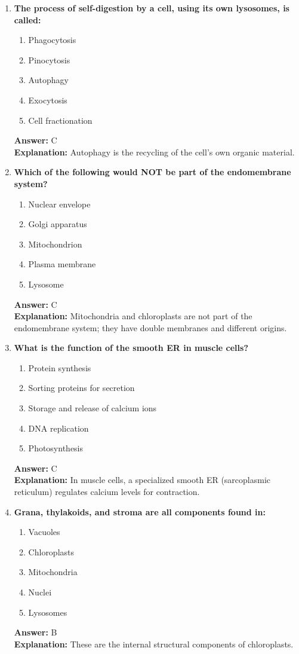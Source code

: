 \documentclass[11pt, a4paper]{article}
\begin{document}
\begin{enumerate}[leftmargin=*, label=\arabic*.]
\item \textbf{The process of self-digestion by a cell, using its own lysosomes, is called:}
\begin{enumerate}[label=\Alph*.]
\item Phagocytosis
\item Pinocytosis
\item Autophagy
\item Exocytosis
\item Cell fractionation
\end{enumerate}
\textbf{Answer:} C \\
\textbf{Explanation:} Autophagy is the recycling of the cell's own organic material.

\item \textbf{Which of the following would NOT be part of the endomembrane system?}
\begin{enumerate}[label=\Alph*.]
\item Nuclear envelope
\item Golgi apparatus
\item Mitochondrion
\item Plasma membrane
\item Lysosome
\end{enumerate}
\textbf{Answer:} C \\
\textbf{Explanation:} Mitochondria and chloroplasts are not part of the endomembrane system; they have double membranes and different origins.

\item \textbf{What is the function of the smooth ER in muscle cells?}
\begin{enumerate}[label=\Alph*.]
\item Protein synthesis
\item Sorting proteins for secretion
\item Storage and release of calcium ions
\item DNA replication
\item Photosynthesis
\end{enumerate}
\textbf{Answer:} C \\
\textbf{Explanation:} In muscle cells, a specialized smooth ER (sarcoplasmic reticulum) regulates calcium levels for contraction.

\item \textbf{Grana, thylakoids, and stroma are all components found in:}
\begin{enumerate}[label=\Alph*.]
\item Vacuoles
\item Chloroplasts
\item Mitochondria
\item Nuclei
\item Lysosomes
\end{enumerate}
\textbf{Answer:} B \\
\textbf{Explanation:} These are the internal structural components of chloroplasts.


\end{enumerate}
\end{document}
